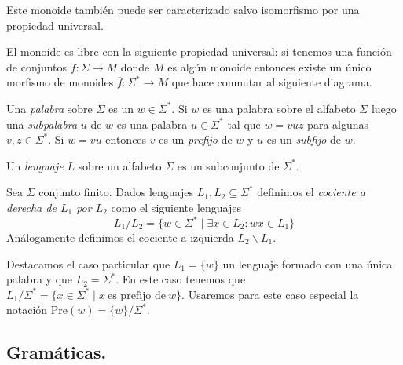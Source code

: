 \documentclass[tesis.tex]{subfiles}
\begin{document}
Este monoide también puede ser caracterizado salvo isomorfismo por una propiedad universal.

\begin{obs}
	El monoide es libre con la siguiente propiedad universal: si tenemos una función de conjuntos $f: \Sigma \to M$ donde $M$ es algún monoide entonces existe un único morfismo de monoides $\overline f: \Sigma^{*} \to M$ que hace conmutar al siguiente diagrama.	
	
	\begin{center}
	\end{center}
	
\end{obs}

Una \emph{palabra} sobre $\Sigma$ es un $w \in \Sigma^*$.
Si $w $ es una palabra sobre el alfabeto $\Sigma$ luego una \emph{subpalabra} $u$ de $w$ es una palabra $u \in \Sigma^*$ tal que $w = vuz$ para algunas $v, z \in \Sigma^*$. 
Si $w = vu$ entonces $v$ es un \emph{prefijo} de $w$ y $u$ es un \emph{subfijo} de $w$.


\begin{deff}
	Un \emph{lenguaje} $L$ sobre un alfabeto $\Sigma$ es un subconjunto de $\Sigma^*$.
\end{deff}

\begin{deff}
	Sea $\Sigma$ conjunto finito.
	Dados lenguajes $L_{1}, L_{2} \subseteq \Sigma^*$ definimos el \emph{cociente a derecha de $L_{1}$ por $L_{2}$} como el siguiente lenguajes
	\[
	L_{1}/L_{2} = \{ w \in \Sigma^* \mid \exists x \in L_{2}: wx \in L_{1}    \}
	\]
	Análogamente definimos el cociente a izquierda $L_{2} \backslash L_{1}$.
\end{deff}
Destacamos el caso particular que $L_{1} = \{w\}$ un lenguaje formado con una única palabra y que $L_{2} = \Sigma^*$.
En este caso tenemos que $L_{1}/\Sigma^* = \{  x \in \Sigma^*  \mid x \ \text{es prefijo de} \ w  \}$.
Usaremos para este caso especial la notación $ \text{Pre}(w) = \{w\}/\Sigma^*$.




\subsection{Gramáticas.}
\end{document}
